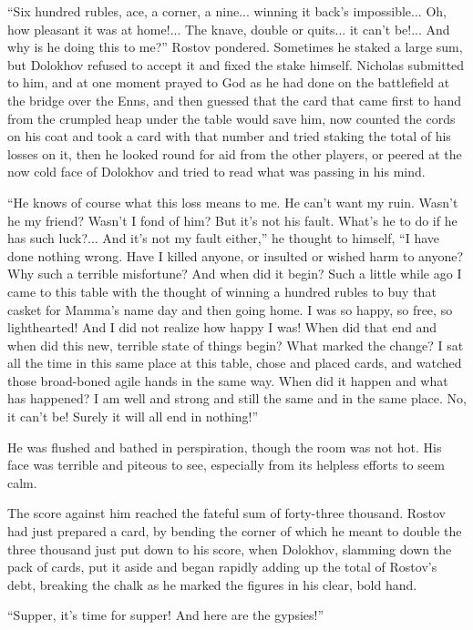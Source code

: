 ``Six hundred rubles, ace, a corner, a nine... winning it back's
impossible... Oh, how pleasant it was at home!... The knave,
double or quits... it can't be!... And why is he doing this to
me?'' Rostov pondered. Sometimes he staked a large sum, but
Dolokhov refused to accept it and fixed the stake
himself. Nicholas submitted to him, and at one moment prayed to
God as he had done on the battlefield at the bridge over the
Enns, and then guessed that the card that came first to hand from
the crumpled heap under the table would save him, now counted the
cords on his coat and took a card with that number and tried
staking the total of his losses on it, then he looked round for
aid from the other players, or peered at the now cold face of
Dolokhov and tried to read what was passing in his mind.

``He knows of course what this loss means to me. He can't want my
ruin.  Wasn't he my friend? Wasn't I fond of him? But it's not
his fault.  What's he to do if he has such luck?... And it's not
my fault either,'' he thought to himself, ``I have done nothing
wrong. Have I killed anyone, or insulted or wished harm to
anyone? Why such a terrible misfortune?  And when did it begin?
Such a little while ago I came to this table with the thought of
winning a hundred rubles to buy that casket for Mamma's name day
and then going home. I was so happy, so free, so lighthearted!
And I did not realize how happy I was! When did that end and when
did this new, terrible state of things begin? What marked the
change? I sat all the time in this same place at this table,
chose and placed cards, and watched those broad-boned agile hands
in the same way. When did it happen and what has happened? I am
well and strong and still the same and in the same place. No, it
can't be! Surely it will all end in nothing!''

He was flushed and bathed in perspiration, though the room was
not hot.  His face was terrible and piteous to see, especially
from its helpless efforts to seem calm.

The score against him reached the fateful sum of forty-three
thousand.  Rostov had just prepared a card, by bending the corner
of which he meant to double the three thousand just put down to
his score, when Dolokhov, slamming down the pack of cards, put it
aside and began rapidly adding up the total of Rostov's debt,
breaking the chalk as he marked the figures in his clear, bold
hand.

``Supper, it's time for supper! And here are the gypsies!''

